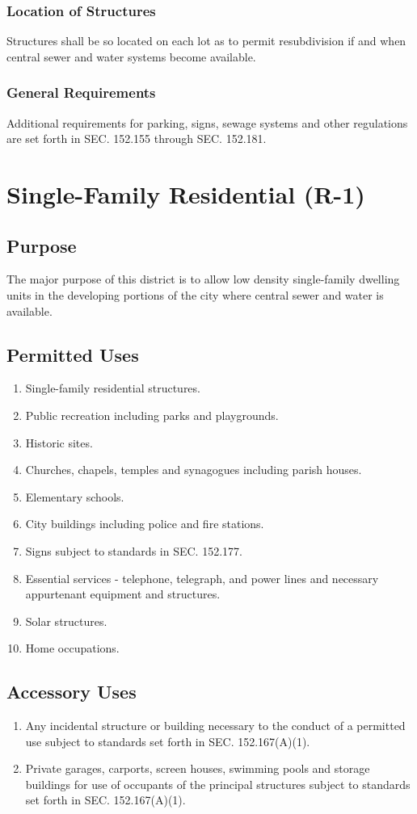 \subsubsection{Location of Structures}
Structures shall be so located on each lot as to permit resubdivision if and when central sewer and water systems become available.
\subsubsection{General Requirements}
Additional requirements for parking, signs, sewage systems and other regulations are set forth in SEC. 152.155 through SEC. 152.181.

\section{Single-Family Residential (R-1)}
\subsection{Purpose}
The major purpose of this district is to allow low density single-family dwelling units in the developing portions of the city where central sewer and water is available.
\subsection{Permitted Uses}
\begin{enumerate}[{\indent}1)]
    \item Single-family residential structures.
    \item Public recreation including parks and playgrounds.
    \item Historic sites.
    \item Churches, chapels, temples and synagogues including parish houses.
    \item Elementary schools.
    \item City buildings including police and fire stations.
    \item Signs subject to standards in SEC. 152.177.
    \item Essential services - telephone, telegraph, and power lines and necessary appurtenant equipment and structures.
    \item Solar structures.
    \item Home occupations.
\end{enumerate}
\subsection{Accessory Uses}
\begin{enumerate}[{\indent}1)]
    \item Any incidental structure or building necessary to the conduct of a permitted use subject to standards set forth in SEC. 152.167(A)(1).
    \item Private garages, carports, screen houses, swimming pools and storage buildings for use of occupants of the principal structures subject to standards set forth in SEC. 152.167(A)(1).
\end{enumerate}
